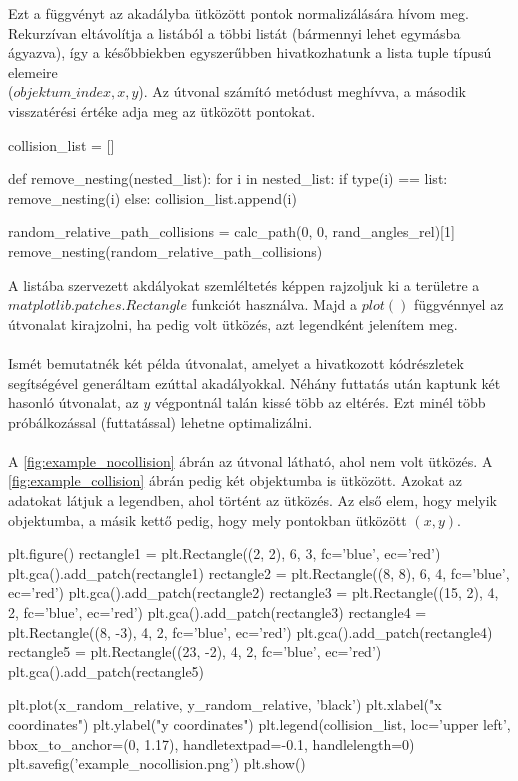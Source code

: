 Ezt a függvényt az akadályba ütközött pontok normalizálására hívom meg. Rekurzívan eltávolítja a listából a többi listát (bármennyi lehet egymásba ágyazva), így a későbbiekben egyszerűbben hivatkozhatunk a lista tuple típusú elemeire\\
($objektum\_index, x, y$). Az útvonal számító metódust meghívva, a második visszatérési értéke adja meg az ütközött pontokat.

\begin{python}
collision_list = []

def remove_nesting(nested_list):
    for i in nested_list:
        if type(i) == list:
            remove_nesting(i)
        else:
            collision_list.append(i)
            
random_relative_path_collisions = calc_path(0, 0, rand_angles_rel)[1]            
remove_nesting(random_relative_path_collisions)
\end{python}

A listába szervezett akdályokat szemléltetés képpen rajzoljuk ki a területre a \\
$ matplotlib.patches.Rectangle $ funkciót használva. Majd a $ plot() $ függvénnyel az útvonalat kirajzolni, ha pedig volt ütközés, azt legendként jelenítem meg.\\\\
Ismét bemutatnék két példa útvonalat, amelyet a hivatkozott kódrészletek segítségével generáltam ezúttal akadályokkal. Néhány futtatás után kaptunk két hasonló útvonalat, az $ y $ végpontnál talán kissé több az eltérés. Ezt minél több próbálkozással (futtatással) lehetne optimalizálni. \\\\
A \ref{fig:example_nocollision} ábrán az útvonal látható, ahol nem volt ütközés. A \ref{fig:example_collision} ábrán pedig két objektumba is ütközött. Azokat az adatokat látjuk a legendben, ahol történt az ütközés. Az első elem, hogy melyik objektumba, a másik kettő pedig, hogy mely pontokban ütközött $ (x, y) $.

\begin{python}
plt.figure()
rectangle1 = plt.Rectangle((2, 2), 6, 3, fc='blue', ec='red')
plt.gca().add_patch(rectangle1)
rectangle2 = plt.Rectangle((8, 8), 6, 4, fc='blue', ec='red')
plt.gca().add_patch(rectangle2)
rectangle3 = plt.Rectangle((15, 2), 4, 2, fc='blue', ec='red')
plt.gca().add_patch(rectangle3)
rectangle4 = plt.Rectangle((8, -3), 4, 2, fc='blue', ec='red')
plt.gca().add_patch(rectangle4)
rectangle5 = plt.Rectangle((23, -2), 4, 2, fc='blue', ec='red')
plt.gca().add_patch(rectangle5)

plt.plot(x_random_relative, y_random_relative, 'black')
plt.xlabel("x coordinates")
plt.ylabel("y coordinates")
plt.legend(collision_list, loc='upper left', bbox_to_anchor=(0, 1.17),
handletextpad=-0.1, handlelength=0)
plt.savefig('example_nocollision.png')
plt.show()
\end{python}


